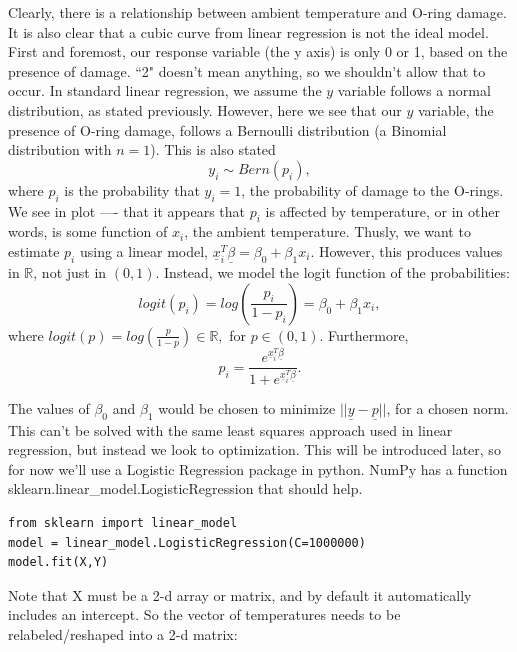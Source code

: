 Clearly, there is a relationship between ambient temperature and O-ring damage. It is also clear that a cubic curve from linear regression is not the ideal model. First and foremost, our response variable (the y axis) is only 0 or 1, based on the presence of damage. ``2" doesn't mean anything, so we shouldn't allow that to occur. In standard linear regression, we assume the $y$ variable follows a normal distribution, as stated previously. However, here we see that our $y$ variable, the presence of O-ring damage, follows a Bernoulli distribution (a Binomial distribution with $n=1$). This is also stated $$y_i \sim Bern(p_i),$$ where $p_i$ is the probability that $y_i=1$, the probability of damage to the O-rings. We see in plot ---- that it appears that $p_i$ is affected by temperature, or in other words, is some function of $x_i$, the ambient temperature.  Thusly, we want to estimate $p_i$ using a linear model, $\underline{x}^T_i \underline{\beta} = \beta_0 + \beta_1x_i$. However, this produces values in $\mathbb{R}$, not just in $(0,1)$. Instead, we model the logit function of the probabilities: 
$$logit(p_i) = log \left(\frac{p_i}{1 - p_i}\right) = \beta_0 + \beta_1x_i,$$ where $logit(p) = log(\frac{p}{1-p}) \in \mathbb{R},$ for $p \in (0,1)$. Furthermore, $$p_i = \frac{e^{\underline{x}^T_i\underline{\beta}}}{1+e^{\underline{x}^T_i\underline{\beta}}}.$$


The values of $\beta_0$ and $\beta_1$ would be chosen to minimize $||\underline{y} - \underline{p}||$, for a chosen norm. This can't be solved with the same least squares approach used in linear regression, but instead we look to optimization. This will be introduced later, so for now we'll use a Logistic Regression package in python. 
NumPy has a function sklearn.linear\_model.LogisticRegression that should help.
\begin{verbatim}
from sklearn import linear_model 
model = linear_model.LogisticRegression(C=1000000)
model.fit(X,Y)
\end{verbatim}

Note that X must be a 2-d array or matrix, and by default it automatically includes an intercept. So the vector of temperatures needs to be relabeled/reshaped into a 2-d matrix:

